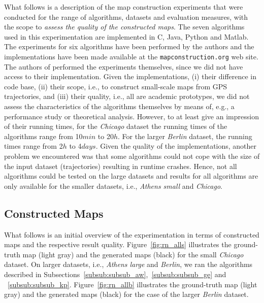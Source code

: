 \documentclass[natbib]{svjour3}                    \smartqed  \usepackage[table]{xcolor}
\begin{document}
What follows is a description of the map construction experiments that were conducted for the range of algorithms, datasets and evaluation measures, with the scope to \emph{assess the quality of the constructed maps}. 
The seven algorithms used in this experimentation are implemented in C, Java, Python and Matlab. The experiments for six algorithms have been performed by the authors and the implementations have been made available at the {\tt mapconstruction.org} web site. The authors of \cite{DBLP:conf/nips/GeSBW11} performed the experiments themselves, since we did not have access to their implementation. 
Given the implementations, (i) their difference in code base, (ii) their scope, i.e., to construct small-scale maps from GPS trajectories, and (iii) their quality, i.e., all are academic prototypes, we did not assess the characteristics of the algorithms themselves by means of, e.g., a performance study or theoretical analysis. However, to at least give an impression of their running times, for the \emph{Chicago} dataset the running times of the algorithms range from 10$min$ to 20$h$. For the larger \emph{Berlin} dataset, the running times range from 2$h$ to 4$days$.
Given the quality of the implementations, another problem we encountered was that some algorithms could not cope with the size of the input dataset (trajectories) resulting in runtime crashes. Hence, not all algorithms could be tested on the large datasets 
and results for all algorithms are only available for the smaller datasets, i.e., \emph{Athens small} and \emph{Chicago}.

\subsection{Constructed Maps}
\label{sub:constructed_maps}

What follows is an initial overview of the experimentation in terms of constructed maps and the respective result quality.
Figure~\ref{fig:rn_alls} illustrates the ground-truth map (light gray) and the generated maps (black) for the small \emph{Chicago} dataset. On larger datasets, i.e., \emph{Athens large} and \emph{Berlin}, we ran the algorithms described in Subsections~\ref{subsub:subsub_aw},~\ref{subsub:subsub_ge} and ~\ref{subsub:subsub_kp}. Figure~\ref{fig:rn_allb} illustrates the ground-truth map (light gray) and the generated maps (black) for the case of the larger \emph{Berlin} dataset.
\end{document}
